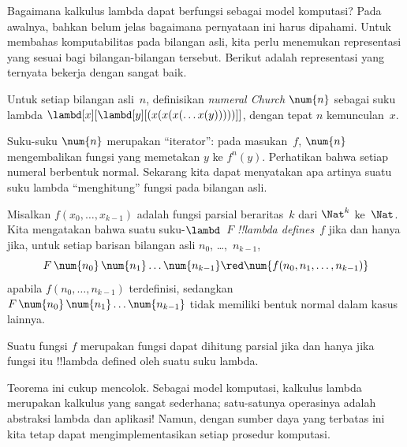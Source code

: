 \documentclass[../../../include/open-logic-section]{subfiles}
\begin{document}

Bagaimana kalkulus lambda dapat berfungsi sebagai model komputasi? Pada
awalnya, bahkan belum jelas bagaimana pernyataan ini harus dipahami. Untuk
membahas komputabilitas pada bilangan asli, kita perlu menemukan representasi
yang sesuai bagi bilangan-bilangan tersebut. Berikut adalah representasi yang
ternyata bekerja dengan sangat baik.

\begin{defn}
Untuk setiap bilangan asli~$n$, definisikan \emph{numeral Church} $\num{n}$
sebagai suku lambda $\lambd[x][\lambd[y][(x(x(x(\dots x(y)))))]]$, dengan
tepat $n$ kemunculan~$x$.
\end{defn}

Suku-suku $\num{n}$ merupakan ``iterator'': pada masukan~$f$, $\num{n}$
mengembalikan fungsi yang memetakan $y$ ke $f^n(y)$. Perhatikan bahwa setiap
numeral berbentuk normal. Sekarang kita dapat menyatakan apa artinya suatu suku
lambda ``menghitung'' fungsi pada bilangan asli.

\begin{defn}
Misalkan $f(x_0, \dots, x_{k-1})$ adalah fungsi parsial beraritas~$k$ dari
$\Nat^k$ ke~$\Nat$. Kita mengatakan bahwa suatu suku-$\lambd$~$F$
\emph{!!{lambda define}s}~$f$ jika dan hanya jika, untuk setiap barisan bilangan
asli $n_0$, \dots,~$n_{k-1}$,
\[
F\, \num{n_0}\, \num{n_1} \dots \num{n_{k-1}} \red \num{f(n_0, n_1, \dots,
  n_{k-1})}
\]
apabila $f(n_0, \dots, n_{k-1})$ terdefinisi, sedangkan
$F\,\num{n_0}\,\num{n_1}\dots\num{n_{k-1}}$ tidak memiliki bentuk normal
dalam kasus lainnya.
\end{defn}

\begin{thm}
Suatu fungsi $f$ merupakan fungsi dapat dihitung parsial jika dan hanya jika
fungsi itu !!{lambda defined} oleh suatu suku lambda.
\end{thm}

\begin{explain}
Teorema ini cukup mencolok. Sebagai model komputasi, kalkulus lambda merupakan
kalkulus yang sangat sederhana; satu-satunya operasinya adalah abstraksi lambda
dan aplikasi!{} Namun, dengan sumber daya yang terbatas ini kita tetap dapat
mengimplementasikan setiap prosedur komputasi.
\end{explain}
\end{document}
